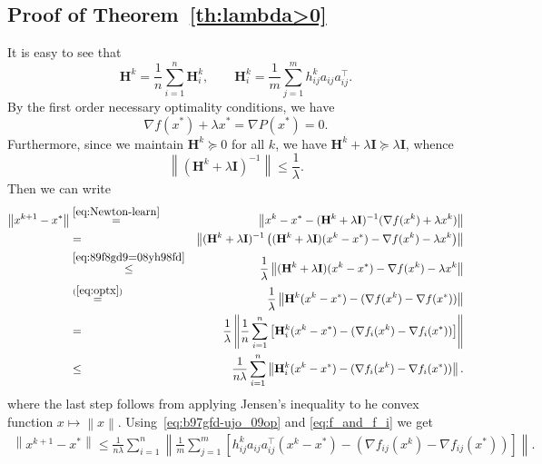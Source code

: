 \documentclass[12pt]{article}
\newcommand{\norm}[1]{\left\|#1\right\|}
\newcommand{\mH}{\mathbf{H}}
\newcommand{\mI}{\mathbf{I}}
\begin{document}
\subsection{Proof of Theorem~\ref{th:lambda>0}}


It is easy to see that \begin{equation}\label{eq:b97gfd-ujo_09op}\mH^k = \frac{1}{n} \sum_{i=1}^n \mH^k_i, \qquad \mH^k_i = \frac{1}{m} \sum_{j=1}^{m} h^k_{ij} a_{ij}a_{ij}^\top .\end{equation}
By the first order necessary optimality conditions, we have
\begin{equation}\label{eq:optx}
\nabla f(x^*) + \lambda x^*  = \nabla P(x^*)= 0. 
\end{equation}
Furthermore, since we maintain $\mH^k \succeq 0$ for all $k$, we have $\mH^k + \lambda \mI \succeq \lambda \mI$, whence  \begin{equation}\label{eq:89f8gd9=08yh98fd}\norm{\left(\mH^k + \lambda \mI \right)^{-1}} \leq \frac{1}{\lambda}.\end{equation}
Then we can write
\begin{eqnarray}
	\norm{ x^{k+1} - x^* } &\overset{\eqref{eq:Newton-learn}}{=}& \norm{ x^k - x^* - (\mH^k + \lambda \mI)^{-1} (\nabla f(x^k) + \lambda x^k) }\notag  \\
	&=& \norm{ (\mH^k + \lambda \mI)^{-1} \left(  (\mH^k + \lambda \mI)(x^k - x^*) - \nabla f(x^k) - \lambda x^k  \right) } \notag \\ 
	&\overset{\eqref{eq:89f8gd9=08yh98fd}}{\leq}& \frac{1}{\lambda} \norm{  (\mH^k + \lambda \mI)(x^k - x^*) - \nabla f(x^k) - \lambda x^k  } \notag \\ 
	&\overset{(\ref{eq:optx})}{=}& \frac{1}{\lambda} \norm{ \mH^k (x^k - x^*) - (\nabla f(x^k) - \nabla f(x^*)) } \notag \\ 
	&=& \frac{1}{\lambda} \norm{ \frac{1}{n} \sum_{i=1}^n \left[\mH_i^k (x^k - x^*) - (\nabla f_i(x^k) - \nabla f_i(x^*)) \right]}\notag  \\ 
	&\leq& \frac{1}{n \lambda} \sum_{i=1}^n \norm{ \mH_i^k (x^k - x^*) - (\nabla f_i(x^k) - \nabla f_i(x^*)) }.\notag
	\end{eqnarray}
	where the last step follows from applying Jensen's inequality to he convex function $x\mapsto \norm{x}$. Using~\eqref{eq:b97gfd-ujo_09op} and \eqref{eq:f_and_f_i} we get
	\begin{eqnarray}
	\norm{x^{k+1}-x^*} \leq \frac{1}{n \lambda} \sum_{i=1}^n \norm{ \frac{1}{m} \sum_{j=1}^m  \left[ h_{ij}^k a_{ij} a_{ij}^\top (x^k - x^*) - (\nabla f_{ij}(x^k) - \nabla f_{ij}(x^*)) \right] }.\label{eq:pop_us_lop_989f}
	\end{eqnarray}
	
\end{document}
